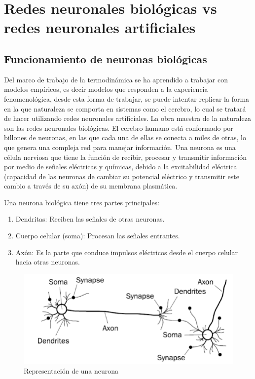 \section{Redes neuronales biológicas vs redes neuronales artificiales}
\label{sec_intro}

\subsection{Funcionamiento de neuronas biológicas}

Del marco de trabajo de la termodinámica se ha aprendido a trabajar con modelos empíricos, es decir modelos que responden a la experiencia fenomenológica, desde esta forma de trabajar, se puede intentar replicar la forma en la que naturaleza se comporta en sistemas como el cerebro, lo cual se tratará de hacer utilizando redes neuronales artificiales. La obra maestra de la naturaleza son las redes neuronales biológicas. El cerebro humano está conformado por billones de neuronas, en las que cada una de ellas se conecta a miles de otras, lo que genera una compleja red para manejar información. Una neurona es una célula nerviosa que tiene la función de recibir, procesar y transmitir información por medio de señales eléctricas y químicas, debido a la excitabilidad eléctrica (capacidad de las neuronas de cambiar su potencial eléctrico y transmitir este cambio a través de su axón) de su membrana plasmática. \  

Una neurona biológica tiene tres partes principales: 
\begin{enumerate}
\item Dendritas: Reciben las señales de otras neuronas.
\item Cuerpo celular (soma): Procesan las señales entrantes.  
\item Axón: Es la parte que conduce impulsos eléctricos desde el cuerpo celular hacia otras neuronas. 
\end{enumerate} 

\begin{figure}[h!] %
		\centering	
		\includegraphics[scale=0.25]{Biological-neural-network-2}
		\caption{Representación de una neurona}
\end{figure}


